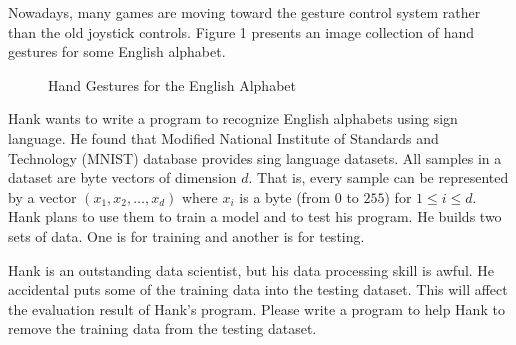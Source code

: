 Nowadays, many games are moving toward the gesture control system rather than 
the old joystick controls. 
Figure 1 presents an image collection of hand gestures for some English 
alphabet.

\begin{figure}[h]
\caption{Hand Gestures for the English Alphabet}
\end{figure}

Hank wants to write a program to recognize English alphabets using sign 
language. He found that Modified National Institute of Standards and 
Technology (MNIST) database provides sing language datasets.
All samples in a dataset are byte vectors of dimension $d$. That is,
every sample can be represented by a vector $(x_1,x_2,\dots,x_d)$ where 
$x_i$ is a byte (from $0$ to $255$) for $1\le i \le d$.
Hank plans to use them to train a model and to test his program. 
He builds two sets of data. One is for training and another is for testing.

Hank is an outstanding data scientist, but his data processing skill is awful.
He accidental puts some of the training data into the testing dataset. 
This will affect the evaluation result of Hank's program.
Please write a program to help Hank to remove the training data from the 
testing dataset.
